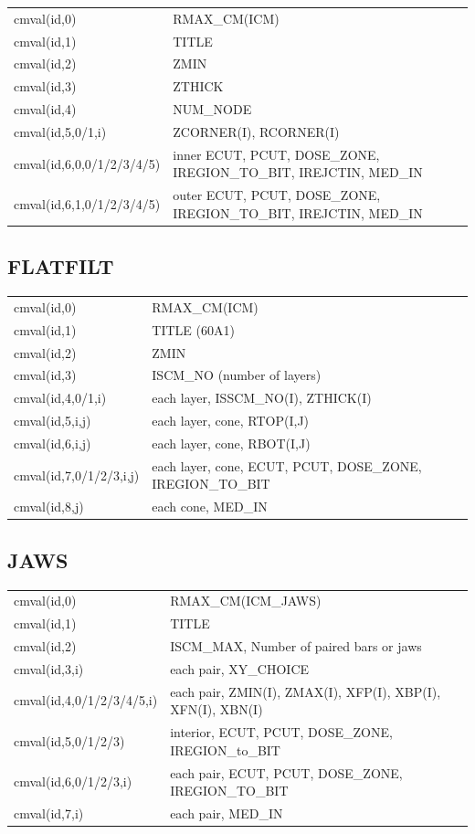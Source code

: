 \documentclass[12pt]{book}
\begin{document}
\begin{tabular}{|p{4.5cm}|p{11.5cm}|}\hline
cmval(id,0) &  RMAX\_CM(ICM)\\
cmval(id,1) &  TITLE \\
cmval(id,2) &  ZMIN \\
cmval(id,3) &  ZTHICK \\
cmval(id,4) &  NUM\_NODE \\
cmval(id,5,0/1,i) &  ZCORNER(I), RCORNER(I) \\
cmval(id,6,0,0/1/2/3/4/5) & inner ECUT, PCUT, DOSE\_ZONE, IREGION\_TO\_BIT,
IREJCTIN, MED\_IN \\
cmval(id,6,1,0/1/2/3/4/5) & outer ECUT, PCUT, DOSE\_ZONE, IREGION\_TO\_BIT,
IREJCTIN, MED\_IN \\\hline
\end{tabular}

\subsection{FLATFILT}

\begin{tabular}{|p{4.5cm}|p{11.5cm}|}\hline
cmval(id,0) &  RMAX\_CM(ICM) \\
cmval(id,1) &  TITLE (60A1) \\
cmval(id,2) &  ZMIN \\
cmval(id,3) &  ISCM\_NO (number of layers)\\
cmval(id,4,0/1,i) & each layer,  ISSCM\_NO(I), ZTHICK(I)\\
cmval(id,5,i,j) & each layer, cone,  RTOP(I,J) \\
cmval(id,6,i,j) & each layer, cone,  RBOT(I,J) \\
cmval(id,7,0/1/2/3,i,j) & each layer, cone,  ECUT, PCUT, DOSE\_ZONE, IREGION\_TO\_BIT \\
cmval(id,8,j) & each cone,  MED\_IN \\\hline
\end{tabular}

\subsection{JAWS}

\begin{tabular}{|p{4.5cm}|p{11.5cm}|}\hline
cmval(id,0) &  RMAX\_CM(ICM\_JAWS) \\
cmval(id,1) &  TITLE \\
cmval(id,2) &  ISCM\_MAX, Number of paired bars or jaws\\
cmval(id,3,i) & each pair, XY\_CHOICE \\
cmval(id,4,0/1/2/3/4/5,i) & each pair, ZMIN(I), ZMAX(I), XFP(I), XBP(I), XFN(I), XBN(I) \\
cmval(id,5,0/1/2/3) & interior, ECUT, PCUT, DOSE\_ZONE, IREGION\_to\_BIT \\
cmval(id,6,0/1/2/3,i) & each pair, ECUT, PCUT, DOSE\_ZONE, IREGION\_TO\_BIT \\
cmval(id,7,i) & each pair, MED\_IN \\\hline
\end{tabular}
\end{document}

